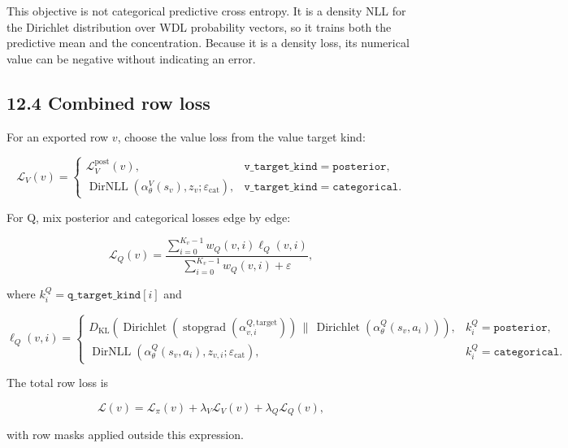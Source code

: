 \documentclass[11pt]{article}
\newcommand{\eps}{\varepsilon}
\newcommand{\Dir}{\operatorname{Dirichlet}}
\newcommand{\stopgrad}{\operatorname{stopgrad}}
\newcommand{\KL}{D_{\mathrm{KL}}}
\newcommand{\DirNLL}{\operatorname{DirNLL}}
\begin{document}
This objective is not categorical predictive cross entropy. It is a density NLL
for the Dirichlet distribution over WDL probability vectors, so it trains both
the predictive mean and the concentration. Because it is a density loss, its
numerical value can be negative without indicating an error.

\subsection*{12.4 Combined row loss}

For an exported row \(v\), choose the value loss from the value target kind:

\[
\mathcal{L}_V(v)=
\begin{cases}
\mathcal{L}_V^{\mathrm{post}}(v),
&\texttt{v\_target\_kind}=\texttt{posterior},\\[2pt]
\DirNLL(\alpha_\theta^V(s_v),z_v;\eps_{\mathrm{cat}}),
&\texttt{v\_target\_kind}=\texttt{categorical}.
\end{cases}
\]

For Q, mix posterior and categorical losses edge by edge:

\[
\mathcal{L}_Q(v)=
\frac{
\sum_{i=0}^{K_v-1}w_Q(v,i)\ell_Q(v,i)
}{
\sum_{i=0}^{K_v-1}w_Q(v,i)+\eps
},
\]

where \(k^Q_i=\texttt{q\_target\_kind}[i]\) and

\[
\ell_Q(v,i)=
\begin{cases}
\KL\left(
\Dir(\stopgrad(\alpha^{Q,\mathrm{target}}_{v,i}))
\,\|\,
\Dir(\alpha_\theta^Q(s_v,a_i))
\right),
&k^Q_i=\texttt{posterior},\\[4pt]
\DirNLL(\alpha_\theta^Q(s_v,a_i),z_{v,i};\eps_{\mathrm{cat}}),
&k^Q_i=\texttt{categorical}.
\end{cases}
\]

The total row loss is

\[
\mathcal{L}(v)
=
\mathcal{L}_\pi(v)
+\lambda_V\mathcal{L}_V(v)
+\lambda_Q\mathcal{L}_Q(v),
\]

with row masks applied outside this expression.
\end{document}
